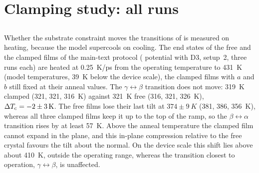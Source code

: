 





\section{Clamping study: all runs}
\label{si:brackets}
\subsection{\protect{}}
\label{si:clamp-reheat}
{\changedcolor
Whether the substrate constraint moves the transitions of \CsSnI{} is measured on heating, because the model supercools
on cooling. The end states of the free and the clamped films of the main-text protocol (\rSCAN{} potential with D3,
setup~2, three runs each) are heated at \SI{0.25}{K/ps} from the operating temperature to \SI{431}{K} (model
temperatures, \SI{39}{K} below the device scale), the clamped films with $a$ and $b$ still fixed at their anneal values.
The $\gamma\leftrightarrow\beta$ transition does not move: \SI{319}{K} clamped (321, 321, \SI{316}{K}) against
\SI{321}{K} free (316, 321, \SI{326}{K}), $\Delta T_\mathrm{c} = -2 \pm \SI{3}{K}$. The free films lose their last tilt at
$374 \pm \SI{9}{K}$ (381, 386, \SI{356}{K}), whereas all three clamped films keep it up to the top of the ramp, so the
$\beta\leftrightarrow\alpha$ transition rises by at least \SI{57}{K}. Above the anneal temperature the clamped film cannot
expand in the plane, and this in-plane compression relative to the free crystal favours the tilt about the normal. On the
device scale this shift lies above about \SI{410}{K}, outside the operating range, whereas the transition closest to
operation, $\gamma\leftrightarrow\beta$, is unaffected.
}

